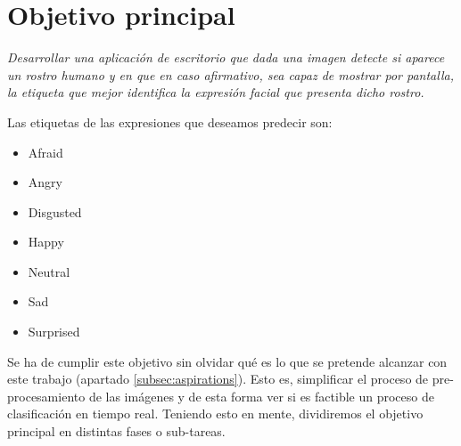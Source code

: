 \documentclass[a4paper,11pt]{book}
\begin{document}
\section{Objetivo principal}
\begin{center}
	\textit{Desarrollar una aplicación de escritorio que dada una imagen detecte si aparece un rostro humano y en que en caso afirmativo, sea capaz de mostrar por pantalla, la etiqueta que mejor identifica la expresión facial que presenta dicho rostro.}\\
\end{center}
Las etiquetas de las expresiones que deseamos predecir son:
\begin{multicols}{2}
	\label{list:expressions}
	\begin{itemize}
		\item Afraid
		\item Angry
		\item Disgusted
		\item Happy
		\item Neutral
		\item Sad
		\item Surprised
	\end{itemize}
\end{multicols}
Se ha de cumplir este objetivo sin olvidar qué es lo que se pretende alcanzar con este trabajo (apartado \ref{subsec:aspirations}). Esto es, simplificar el proceso de pre-procesamiento de las imágenes y de esta forma ver si es factible un proceso de clasificación en tiempo real. Teniendo esto en mente, dividiremos el objetivo principal en distintas fases o sub-tareas.
\end{document}
